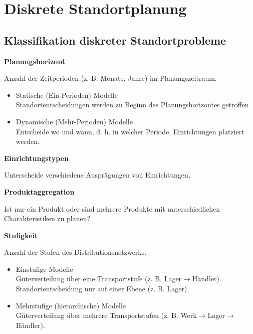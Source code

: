 
\chapter{Diskrete Standortplanung} %
\label{cha:diskrete_standortplanung}

  \section{Klassifikation diskreter Standortprobleme} %
  \label{sec:klassifikation_diskreter_standortprobleme}

    \par \textbf{Planungshorizont}
    \par Anzahl der Zeitperioden (z. B. Monate, Jahre) im Planungszeitraum.
    \begin{itemize}
      \item Statische (Ein-Perioden) Modelle\\
      Standortentscheidungen werden zu Beginn des Planungshorizontes getroffen
      \item Dynamische (Mehr-Perioden) Modelle\\
      Entscheide wo und wann, d. h. in welcher Periode, Einrichtungen platziert werden.
    \end{itemize}

    \par \textbf{Einrichtungstypen}
    \par Unterscheide verschiedene Ausprägungen von Einrichtungen,

    \par \textbf{Produktaggregation}
    \par Ist nur ein Produkt oder sind mehrere Produkte mit unterschiedlichen Charakteristiken zu planen?

    \par \textbf{Stufigkeit}
    \par Anzahl der Stufen des Distributionsnetzwerks.
    \begin{itemize}
      \item Einstufige Modelle\\
      Güterverteilung über eine Transportstufe (z. B. Lager$\rightarrow$Händler). Standortentscheidung nur auf einer Ebene (z. B. Lager).
      \item Mehrstufige (hierarchische) Modelle\\
      Güterverteilung über mehrere Transportstufen (z. B. Werk$\rightarrow$Lager$\rightarrow$Händler).
    \end{itemize}

